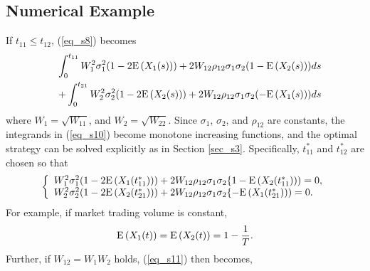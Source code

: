 \subsection{Numerical Example}
If $t_{11} \leq t_{12}$, (\ref{eq_s8}) becomes
\begin{eqnarray}
    &   & \int_0^{t_{11}}W_1^2\sigma_1^2(1-2{\mathrm{E}}\left( X_1(s) \right))+2W_{12}\rho_{12}\sigma_1\sigma_2(1-{\mathrm{E}}\left( X_2(s) \right))ds \nonumber \\
    &   & +\int_0^{t_{21}}W_2^2\sigma_2^2(1-2{\mathrm{E}}\left( X_2(s) \right))+2W_{12}\rho_{12}\sigma_1\sigma_2(-{\mathrm{E}}\left( X_1(s) \right))ds \label{eq_s10}
\end{eqnarray}
where $W_1=\sqrt{W_{11}}$, and $W_2=\sqrt{W_{22}}$.  Since $\sigma_1$, $\sigma_2$, and $\rho_{12}$ are constants, the integrands in (\ref{eq_s10}) become monotone increasing functions, and the optimal strategy can be solved explicitly as in Section \ref{sec_s3}.  Specifically, $t_{11}^*$ and $t_{12}^*$ are chosen so that 
\begin{equation}\label{eq_s11}
\left\{
  \begin{array}{ll}
    W_1^2\sigma_1^2(1-2{\mathrm{E}}\left( X_1(t_{11}^*) \right))+2W_{12}\rho_{12}\sigma_1\sigma_2\{1-{\mathrm{E}}\left( X_2(t_{11}^*) \right))=0, \\
    W_2^2\sigma_2^2(1-2{\mathrm{E}}\left( X_2(t_{21}^*) \right))+2W_{12}\rho_{12}\sigma_1\sigma_2\{-{\mathrm{E}}\left( X_1(t_{21}^*) \right))=0.
  \end{array}
\right.
\end{equation}
For example, if market trading volume is constant, 
\[
  {\mathrm{E}}\left( X_1(t) \right)= {\mathrm{E}}\left( X_2(t) \right)=1-\frac{1}{T}.
\]
Further, if $W_{12}=W_1W_2$ holds, (\ref{eq_s11}) then becomes,

